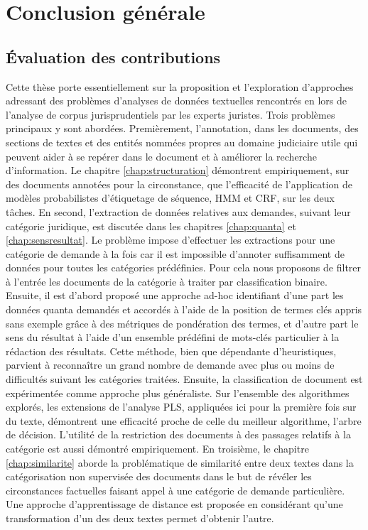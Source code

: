 \chapter*{Conclusion générale}
\label{chap:conclusion}

\section{Évaluation des contributions}
\label{sec:conclusion:contributions}
Cette thèse  porte essentiellement sur la proposition et l'exploration d'approches adressant des problèmes d'analyses de données textuelles rencontrés en lors de l'analyse de corpus jurisprudentiels par les experts juristes. Trois problèmes principaux y sont abordées. Premièrement, l'annotation, dans les documents, des sections de textes et des entités nommées propres au domaine judiciaire utile qui peuvent aider à se repérer dans le document et à améliorer la recherche d'information. Le chapitre \ref{chap:structuration}  démontrent empiriquement, sur des documents annotées pour la circonstance, que l'efficacité de l'application de modèles probabilistes d'étiquetage de séquence, HMM et CRF, sur les deux tâches. En second, l'extraction de données relatives aux demandes, suivant leur catégorie juridique, est discutée dans les chapitres \ref{chap:quanta} et \ref{chap:sensresultat}. Le problème impose d'effectuer les extractions pour une catégorie de demande à la fois car il est impossible d'annoter suffisamment de données pour toutes les catégories prédéfinies. Pour cela nous proposons de filtrer à l'entrée les documents de la catégorie à traiter par classification binaire. Ensuite, il est d'abord proposé une approche ad-hoc identifiant d'une part les données quanta demandés et accordés à l'aide de la position de termes clés appris sans exemple grâce à des métriques de pondération des termes, et d'autre part le sens du résultat à l'aide d'un ensemble prédéfini de mots-clés particulier à la rédaction des résultats. Cette méthode, bien que dépendante d'heuristiques, parvient à reconnaître un grand nombre de demande avec plus ou moins de difficultés suivant les catégories traitées. Ensuite, la classification de document est expérimentée comme approche plus généraliste. Sur l'ensemble des algorithmes explorés, les extensions de l'analyse PLS, appliquées ici pour la première fois sur du texte, démontrent une efficacité proche de celle du meilleur algorithme, l'arbre de décision.  L'utilité de la restriction des documents à des passages relatifs à la catégorie est aussi démontré empiriquement. En troisième, le chapitre \ref{chap:similarite} aborde la problématique de similarité entre deux textes dans la catégorisation non supervisée des documents dans le but de révéler les circonstances factuelles faisant appel à une catégorie de demande particulière. Une approche d'apprentissage de distance est proposée en considérant qu'une transformation d'un des deux textes permet d'obtenir l'autre.
